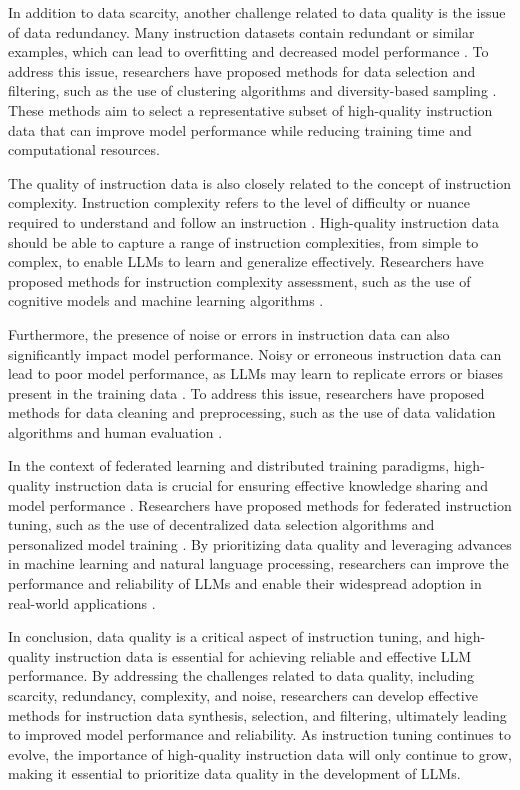 \documentclass[11pt]{article}
\begin{document}
In addition to data scarcity, another challenge related to data quality is the issue of data redundancy. Many instruction datasets contain redundant or similar examples, which can lead to overfitting and decreased model performance \cite{ref93}. To address this issue, researchers have proposed methods for data selection and filtering, such as the use of clustering algorithms \cite{ref94} and diversity-based sampling \cite{ref95}. These methods aim to select a representative subset of high-quality instruction data that can improve model performance while reducing training time and computational resources.

The quality of instruction data is also closely related to the concept of instruction complexity. Instruction complexity refers to the level of difficulty or nuance required to understand and follow an instruction \cite{ref24}. High-quality instruction data should be able to capture a range of instruction complexities, from simple to complex, to enable LLMs to learn and generalize effectively. Researchers have proposed methods for instruction complexity assessment, such as the use of cognitive models \cite{ref21} and machine learning algorithms \cite{ref37}.

Furthermore, the presence of noise or errors in instruction data can also significantly impact model performance. Noisy or erroneous instruction data can lead to poor model performance, as LLMs may learn to replicate errors or biases present in the training data \cite{ref96}. To address this issue, researchers have proposed methods for data cleaning and preprocessing, such as the use of data validation algorithms \cite{ref97} and human evaluation \cite{ref98}.

In the context of federated learning and distributed training paradigms, high-quality instruction data is crucial for ensuring effective knowledge sharing and model performance \cite{ref99}. Researchers have proposed methods for federated instruction tuning, such as the use of decentralized data selection algorithms \cite{ref99} and personalized model training \cite{ref100}. By prioritizing data quality and leveraging advances in machine learning and natural language processing, researchers can improve the performance and reliability of LLMs and enable their widespread adoption in real-world applications \cite{ref32}.

In conclusion, data quality is a critical aspect of instruction tuning, and high-quality instruction data is essential for achieving reliable and effective LLM performance. By addressing the challenges related to data quality, including scarcity, redundancy, complexity, and noise, researchers can develop effective methods for instruction data synthesis, selection, and filtering, ultimately leading to improved model performance and reliability. As instruction tuning continues to evolve, the importance of high-quality instruction data will only continue to grow, making it essential to prioritize data quality in the development of LLMs.
\end{document}
